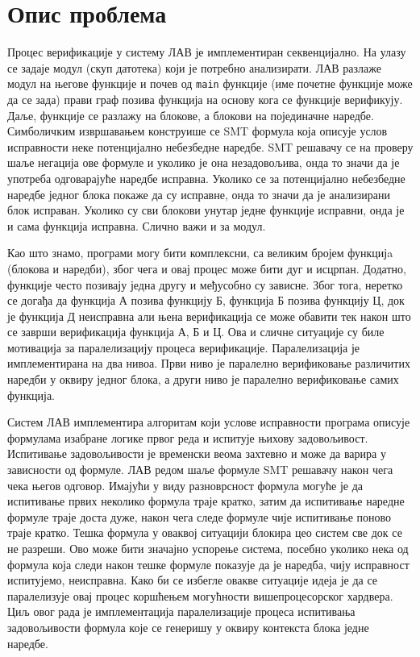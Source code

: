 \documentclass[12pt,oneside]{memoir}
\begin{document}
\section{Опис проблема}
Процес верификације у систему ЛАВ је имплементиран секвенцијално. На улазу се задаје модул (скуп датотека) који је потребно анализирати.  ЛАВ разлаже модул на његове функције и почев од \texttt{main} функције (име почетне функције може да се зада) прави граф позива функција  на основу кога се функције верификују. Даље, функције се разлажу на блокове, а блокови на појединачне наредбе. Симболичким извршавањем конструише се SMT формула која описује услов исправности неке потенцијално небезбедне наредбе. SMT решавачу се на проверу шаље негација ове формуле и уколико је она незадовољива, онда то значи да је употреба одговарајуће наредбе исправна. Уколико се за потенцијално небезбедне наредбе једног блока покаже да су исправне, онда то значи да је анализирани блок исправан. Уколико су сви блокови унутар једне функције исправни, онда је и сама функција исправна. Слично важи и за модул. 

Као што знамо, програми могу бити комплексни, са великим бројем функцијa (блокова и наредби), због чега и овај процес може бити дуг и исцрпан. Додатно, функције често позивају једна другу и међусобно су зависне. Због тога, неретко се догађа да функција А позива функцију Б, функција Б позива функцију Ц, док је функција Д неисправна али њена верификација се може обавити тек након што се заврши верификација функција А, Б и Ц. Ова и сличне ситуације су биле мотивација за паралелизацију процеса верификације. Паралелизација је имплементирана на два нивоа. Први ниво је паралелно верификовање различитих наредби у оквиру једног блока, а други ниво је паралелно верификовање самих функција.

Систем ЛАВ имплементира алгоритам који услове исправности програма описује формулама изабране логике првог реда и испитује њихову задовољивост.  Испитивање задовољивости је  временски веома захтевно и може да варира у зависности од формуле. ЛАВ редом шаље формуле SMT решавачу након чега чека његов одговор. Имајући у виду разноврсност формула могуће је да испитивање првих неколико формула траје кратко, затим да испитивање наредне формуле траје доста дуже, након чега следе формуле чије испитивање поново траје кратко. Тешка формула у оваквој ситуацији блокира цео систем све док се не разреши. Ово може бити значајно успорење система, посебно уколико нека од формула која следи након тешке формуле показује да је наредба, чију исправност испитујемо, неисправна. 	
Како би се избегле овакве ситуације идеја је да се паралелизује овај процес коршћењем могућности вишепроцесорског хардвера. Циљ овог рада је имплементација паралелизације процеса испитивања задовољивости формула које се генеришу у оквиру контекста блока једне наредбе. 
\end{document}
